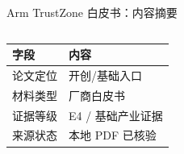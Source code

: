 \begin{frame}[t,shrink=6]{Arm TrustZone 白皮书：内容摘要}
\begin{columns}[T,totalwidth=\textwidth]
\begin{column}{0.49\textwidth}
{\begin{minipage}[t]{0.97\linewidth}
\begin{minipage}{0.92\linewidth}
      \scriptsize {\tiny
\begin{tabularx}{\linewidth}{@{}YY@{}}
\toprule
\textbf{字段} & \textbf{内容} \\
\midrule
论文定位 & 开创/基础入口 \\
材料类型 & 厂商白皮书 \\
证据等级 & E4 / 基础产业证据 \\
来源状态 & 本地 PDF 已核验 \\
\bottomrule
\end{tabularx}
}
    \end{minipage}
    \vspace{1mm}
  \end{minipage}}
  \end{column}
\end{columns}
\end{frame}


